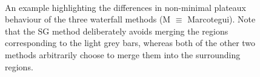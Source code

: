 \documentclass[preprint,a4paper]{elsarticle}
\newenvironment{stusubfig}[1]
{
	\begin{figure}[#1]
	\begin{center}
}
{
	\end{center}
	\end{figure}
}
\begin{document}
\begin{stusubfig}{!t}
	\hspace{4mm}%
	\\
	\hspace{4mm}%
\caption{An example highlighting the differences in non-minimal plateaux behaviour of the three waterfall methods (M $\equiv$ Marcotegui). Note that the SG method deliberately avoids merging the regions corresponding to the light grey bars, whereas both of the other two methods arbitrarily choose to merge them into the surrounding regions.}
\label{fig:plateaux-behaviour}
\end{stusubfig}
\end{document}

